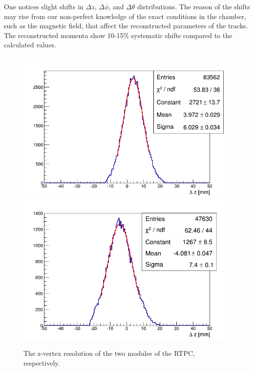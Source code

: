 One notices slight shifts in $\Delta z$, $\Delta \phi$, and $\Delta \theta$ distributions. The reason of the shifts may rise from our non-perfect knowledge of the exact conditions in the chamber, such as the magnetic field, that affect the reconstructed parameters of the tracks. The reconstructed momenta show 10-15$\%$ systematic shifts compared to the calculated values.

\begin{figure}[tbp]
\includegraphics[scale=0.31]{fig_rtpc/fit_delta_z_l.png}
\includegraphics[scale=0.31]{fig_rtpc/fit_delta_z_r.png}
\caption{The z-vertex resolution of the two modules of the RTPC, respectively.}
\label{fig:rtpc_resolution_z}
\end{figure}

